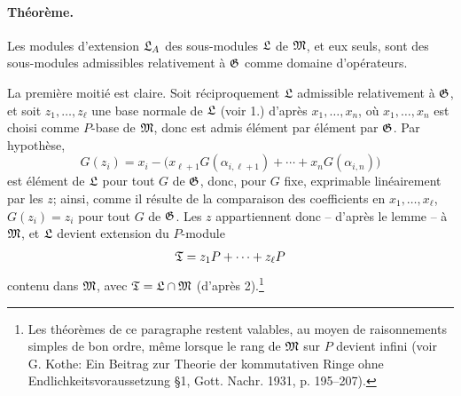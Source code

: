 \paragraph{Théorème.}
Les modules d'extension \(\mathfrak L_A\) des sous-modules \(\mathfrak L\) de \(\mathfrak M\), et eux seuls, sont des sous-modules admissibles relativement à \(\mathfrak G\) comme domaine d'opérateurs.

La première moitié est claire. Soit réciproquement \(\mathfrak L\) admissible relativement à \(\mathfrak G\), et soit \(z_1,\ldots,z_\ell\) une base normale de \(\mathfrak L\) (voir 1.) d'après \(x_1,\ldots,x_n\), où \(x_1,\ldots,x_n\) est choisi comme \(P\)-base de \(\mathfrak M\), donc est admis élément par élément par \(\mathfrak G\). Par hypothèse,
\[
        G(z_i)=x_i-\bigl(x_{\ell+1}G(\alpha_{i,\ell+1})
              +\cdots+x_nG(\alpha_{i,n})\bigr)
\]
est élément de \(\mathfrak L\) pour tout \(G\) de \(\mathfrak G\), donc, pour \(G\) fixe, exprimable linéairement par les \(z\); ainsi, comme il résulte de la comparaison des coefficients en \(x_1,\ldots,x_\ell\), \(G(z_i)=z_i\) pour tout \(G\) de \(\mathfrak G\). Les \(z\) appartiennent donc -- d'après le lemme -- à \(\mathfrak M\), et \(\mathfrak L\) devient extension du \(P\)-module
\[
        \mathfrak T=z_1P+\cdots+z_\ell P
\]
contenu dans \(\mathfrak M\), avec \(\mathfrak T=\mathfrak L\cap\mathfrak M\) (d'après 2).\footnote{Les théorèmes de ce paragraphe restent valables, au moyen de raisonnements simples de bon ordre, même lorsque le rang de \(\mathfrak M\) sur \(P\) devient infini (voir G. Kothe: Ein Beitrag zur Theorie der kommutativen Ringe ohne Endlichkeitsvoraussetzung \S 1, Gott. Nachr. 1931, p. 195--207).}

\clearpage
